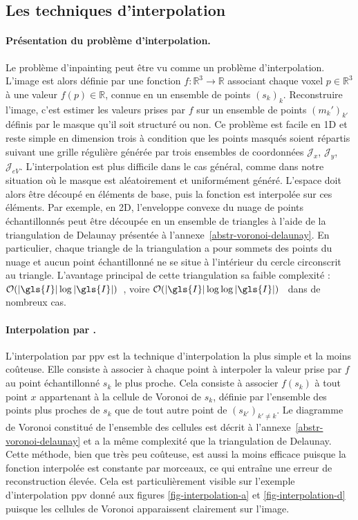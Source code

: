 \subsection{Les techniques d'interpolation}\label{sec-interpolation}

\paragraph{Présentation du problème d'interpolation.} Le problème d'inpainting peut être vu comme un problème d'interpolation. L'image est alors définie par une fonction $f:\mathbb{R}^3\rightarrow \mathbb{R}$ associant chaque voxel $p\in\mathbb{R}^3$ à une valeur $f(p)\in\mathbb{R}$, connue en un ensemble de points $(s_k)_{k}$. Reconstruire l'image, c'est estimer les valeurs prises par $f$ sur un ensemble de points $(m_k')_{k'}$ définis par le masque qu'il soit structuré ou non. 
%
Ce problème est facile en 1D et reste simple en dimension trois à condition que les points masqués soient répartis suivant une grille régulière générée par trois ensembles de coordonnées $\mathcal{J}_x$, $\mathcal{J}_y$, $\mathcal{J}_{eV}$. L'interpolation est plus difficile dans le cas général, comme dans notre situation où le masque est aléatoirement et uniformément généré. L'espace doit alors être découpé en éléments de base, puis la fonction est interpolée sur ces éléments. Par exemple, en 2D, l'enveloppe convexe du nuage de points échantillonnés peut être découpée en un ensemble de triangles à l'aide de la triangulation de Delaunay présentée à l'annexe~\ref{abstr-voronoi-delaunay}. En particulier, chaque triangle de la triangulation a pour sommets des points du nuage et aucun point échantillonné ne se situe à l'intérieur du cercle circonscrit au triangle. L'avantage principal de cette triangulation sa faible complexité : $\mathcal{O}(|\gls{I}|\log |\gls{I}|)$~\cite{lee1980two}, voire $\mathcal{O}(|\gls{I}|\log \log |\gls{I}|)$~\cite{dwyer1987faster} dans de nombreux cas.

\paragraph{Interpolation par .} L'interpolation par \gls{ppv} est la technique d'interpolation la plus simple et la moins coûteuse. Elle consiste à associer à chaque point à interpoler la valeur prise par $f$ au point échantillonné $s_{k}$ le plus proche. Cela consiste à associer $f(s_{k})$ à tout point $x$ appartenant à la cellule de Voronoi de $s_{k}$, définie par l'ensemble des points plus proches de $s_k$ que de tout autre point de $(s_{k'})_{k'\neq k}$. Le diagramme de Voronoi constitué de l'ensemble des cellules est décrit à l'annexe~\ref{abstr-voronoi-delaunay} et a la même complexité que la triangulation de Delaunay. Cette méthode, bien que très peu coûteuse, est aussi la moins efficace puisque la fonction interpolée est constante par morceaux, ce qui entraîne une erreur de reconstruction élevée. Cela est particulièrement visible sur l'exemple d'interpolation \gls{ppv} donné aux figures \ref{fig-interpolation-a} et \ref{fig-interpolation-d} puisque les cellules de Voronoi apparaissent clairement sur l'image.

